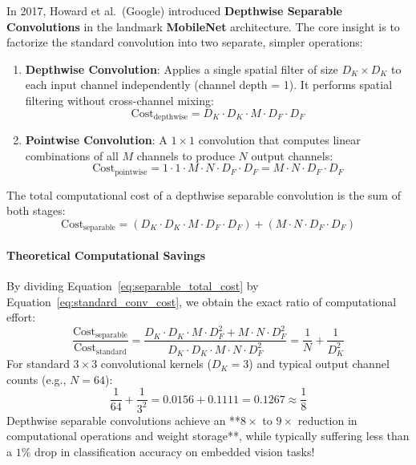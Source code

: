 In 2017, Howard et al.\ (Google) introduced \textbf{Depthwise Separable Convolutions} in the landmark \textbf{MobileNet} architecture. The core insight is to factorize the standard convolution into two separate, simpler operations:
\begin{enumerate}
    \item \textbf{Depthwise Convolution}: Applies a single spatial filter of size $D_K \times D_K$ to each input channel independently (channel depth = 1). It performs spatial filtering without cross-channel mixing:
    \begin{equation}
    \text{Cost}_{\text{depthwise}} = D_K \cdot D_K \cdot M \cdot D_F \cdot D_F\label{eq:depthwise_cost}
    \end{equation}
    \item \textbf{Pointwise Convolution}: A $1 \times 1$ convolution that computes linear combinations of all $M$ channels to produce $N$ output channels:
    \begin{equation}
    \text{Cost}_{\text{pointwise}} = 1 \cdot 1 \cdot M \cdot N \cdot D_F \cdot D_F = M \cdot N \cdot D_F \cdot D_F\label{eq:pointwise_cost}
    \end{equation}
\end{enumerate}

The total computational cost of a depthwise separable convolution is the sum of both stages:
\begin{equation}
\text{Cost}_{\text{separable}} = \left( D_K \cdot D_K \cdot M \cdot D_F \cdot D_F \right) + \left( M \cdot N \cdot D_F \cdot D_F \right)\label{eq:separable_total_cost}
\end{equation}

\paragraph{Theoretical Computational Savings}
By dividing Equation~\eqref{eq:separable_total_cost} by Equation~\eqref{eq:standard_conv_cost}, we obtain the exact ratio of computational effort:
\begin{equation}
\frac{\text{Cost}_{\text{separable}}}{\text{Cost}_{\text{standard}}} = \frac{D_K \cdot D_K \cdot M \cdot D_F^2 + M \cdot N \cdot D_F^2}{D_K \cdot D_K \cdot M \cdot N \cdot D_F^2} = \frac{1}{N} + \frac{1}{D_K^2}\label{eq:cost_ratio}
\end{equation}
For standard $3 \times 3$ convolutional kernels ($D_K = 3$) and typical output channel counts (e.g., $N = 64$):
\begin{equation*}
\frac{1}{64} + \frac{1}{3^2} = 0.0156 + 0.1111 = 0.1267 \approx \frac{1}{8}
\end{equation*}
Depthwise separable convolutions achieve an **$8\times$ to $9\times$ reduction in computational operations and weight storage**, while typically suffering less than a $1\%$ drop in classification accuracy on embedded vision tasks!

